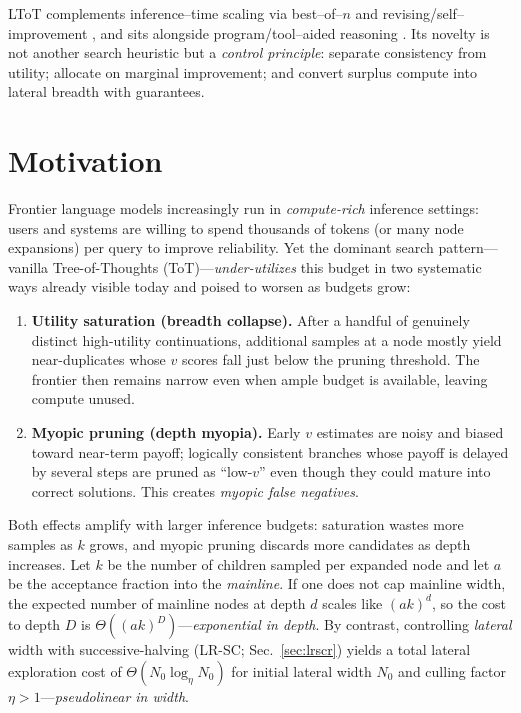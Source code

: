\documentclass{article}
\begin{document}
LToT complements inference--time scaling via best--of--$n$ \citep{chen2024bot,yang2024bot} and revising/self--improvement \citep{madaan2023selfrefine}, and sits alongside program/tool--aided reasoning \citep{gao2022pal,chen2022pot}.
Its novelty is not another search heuristic but a \emph{control principle}: separate consistency from utility; allocate on marginal improvement; and convert surplus compute into lateral breadth with guarantees.

\section{Motivation}
\label{section:motivation}
Frontier language models increasingly run in \emph{compute-rich} inference settings:
users and systems are willing to spend thousands of tokens (or many node expansions) per query to improve reliability.
Yet the dominant search pattern—vanilla Tree-of-Thoughts (ToT)—\emph{under-utilizes} this budget in two systematic ways already visible today and poised to worsen as budgets grow:
\begin{enumerate}[leftmargin=*, itemsep=2pt, topsep=2pt]
    \item \textbf{Utility saturation (breadth collapse).} After a handful of genuinely distinct high-utility continuations, additional samples at a node mostly yield near-duplicates whose $v$ scores fall just below the pruning threshold. The frontier then remains narrow even when ample budget is available, leaving compute unused.
    \item \textbf{Myopic pruning (depth myopia).} Early $v$ estimates are noisy and biased toward near-term payoff; logically consistent branches whose payoff is delayed by several steps are pruned as ``low-$v$'' even though they could mature into correct solutions. This creates \emph{myopic false negatives}.
\end{enumerate}
Both effects amplify with larger inference budgets: saturation wastes more samples as $k$ grows, and myopic pruning discards more candidates as depth increases.
Let $k$ be the number of children sampled per expanded node and let $a$ be the acceptance fraction into the \emph{mainline}.
If one does not cap mainline width, the expected number of mainline nodes at depth $d$ scales like $(ak)^d$, so the cost to depth $D$ is $\Theta((ak)^D)$—\emph{exponential in depth}.
By contrast, controlling \emph{lateral} width with successive-halving (LR-SC; Sec.~\ref{sec:lrscr}) yields a total lateral exploration cost of $\Theta(N_0 \log_{\eta} N_0)$ for initial lateral width $N_0$ and culling factor $\eta>1$—\emph{pseudolinear in width}.
\end{document}
